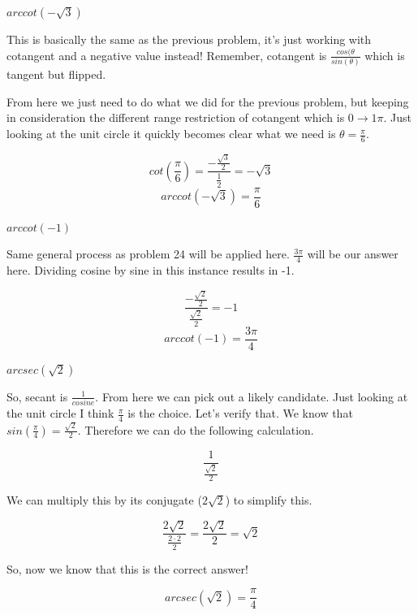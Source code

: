 \documentclass[10pt,letterpaper]{amspset}
\begin{document}
\begin{problem}[26]
    $arccot(-\sqrt{3})$
\end{problem}

\begin{solution}
    This is basically the same as the previous problem, it's just working with cotangent and a negative value instead! Remember, cotangent is $\frac{cos(\theta}{sin(\theta)}$ which is tangent but flipped. 
    
    From here we just need to do what we did for the previous problem, but keeping in consideration the different range restriction of cotangent which is $0 \rightarrow 1\pi$. Just looking at the unit circle it quickly becomes clear what we need is $\theta = \frac{\pi}{6}$.
    
    \[ cot(\frac{\pi}{6}) =  \frac{ -\frac{\sqrt{3}}{2} } { \frac{1}{2} } = -\sqrt{3}\]
    \[\boxed{ arccot(-\sqrt{3}) = \frac{\pi}{6} }\]
\end{solution}


\begin{problem}[27]
    $arccot(-1)$
\end{problem}

\begin{solution}
    Same general process as problem 24 will be applied here. $\frac{3\pi}{4}$ will be our answer here. Dividing cosine by sine in this instance results in -1.  
    
    \[ \frac{ -\frac{ \sqrt{2} }{2} } { \frac{ \sqrt{2} }{2} } = -1\]
    \[ arccot(-1) = \frac{3\pi}{4}\]
\end{solution}


\pagebreak


\begin{problem}[35]
    $arcsec(\sqrt{2})$
\end{problem}

\begin{solution}
    So, secant is $\frac{1}{cosine}$. From here we can pick out a likely candidate. Just looking at the unit circle I think $\frac{\pi}{4}$ is the choice. Let's verify that. We know that $sin(\frac{\pi}{4}) = \frac{ \sqrt{2} } {2}$. Therefore we can do the following calculation. 
    
    \[ \frac{1}{ \frac{\sqrt{2}}{2}  } \] 
    
    We can multiply this by its conjugate ($2\sqrt{2}$) to simplify this. 
    
    \[ \frac{2\sqrt{2}} {\frac{2 \cdot 2}{2}} = \frac{2\sqrt{2}}{2} = \sqrt{2} \]
    
    So, now we know that this is the correct answer! 
    
    \[\boxed{ arcsec(\sqrt{2}) = \frac{\pi}{4} }\]
\end{solution}
\end{document}
